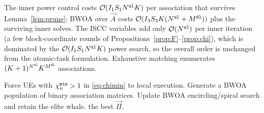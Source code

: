 \documentclass[journal]{IEEEtran}
\begin{document}
The {\color{blue}inner power control} costs $\mathcal{O}(I_1 S_1 N^{\tt ul}K)$ per association that survives Lemma~\ref{lem:prune}; BWOA over $\vec{A}$ costs $\mathcal{O}(I_3 S_3 K(N^{\tt ul}+M^{\tt dl}))$ plus the surviving inner solves. The ISCC variables add only $\mathcal{O}(N^{\tt ul})$ per inner iteration (a few block-coordinate rounds of Propositions~\ref{prop:F}--\ref{prop:chi}), which is dominated by the $\mathcal{O}(I_1 S_1 N^{\tt ul}K)$ power search, so the overall order is unchanged from the atomic-task formulation. Exhaustive matching enumerates $(K+1)^{N^{\tt ul}}K^{M^{\tt dl}}$ associations.

\begin{algorithm}[!t]
\DontPrintSemicolon
{}
Force UEs with $\chi_n^{\tt min}>1$ in \eqref{eq:chimin} to local execution.\;
Generate a BWOA population of binary association matrices.\;
Update BWOA encircling/spiral search and retain the elite whale.\;
\Return the best $\vec{\Pi}$.\;
\caption{Hybrid WOA/IWOA/PSO--BWOA for SI-TNTN UAV edge-inference ISCC.}
\label{alg:hyb}
\end{algorithm}
\end{document}
